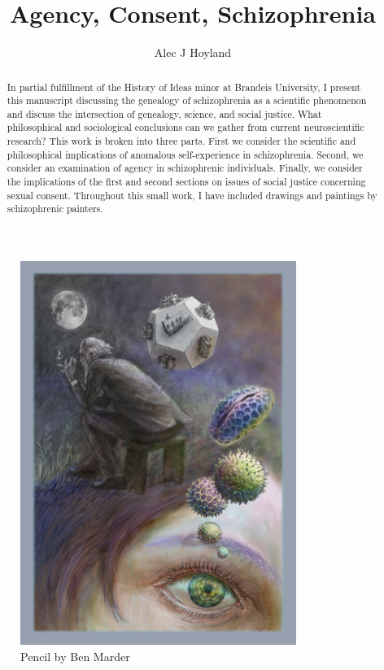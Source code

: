 \documentclass[]{article}
\title{Agency, Consent, Schizophrenia}
\author{Alec J Hoyland}
\begin{document}
\maketitle

\begin{abstract}

	In partial fulfillment of the History of Ideas minor at Brandeis University, I present this manuscript discussing the genealogy of schizophrenia as a scientific phenomenon and discuss the intersection of genealogy, science, and social justice. What philosophical and sociological conclusions can we gather from current neuroscientific research? This work is broken into three parts. First we consider the scientific and philosophical implications of anomalous self-experience in schizophrenia. Second, we consider an examination of agency in schizophrenic individuals. Finally, we consider the implications of the first and second sections on issues of social justice concerning sexual consent. Throughout this small work, I have included drawings and paintings by schizophrenic painters. 

\end{abstract}

\begin{figure}
	\centering
	\includegraphics[width=0.8\textwidth]{graphics/BenMarder1}
	\caption{Pencil by Ben Marder}
\end{figure}
\end{document}
